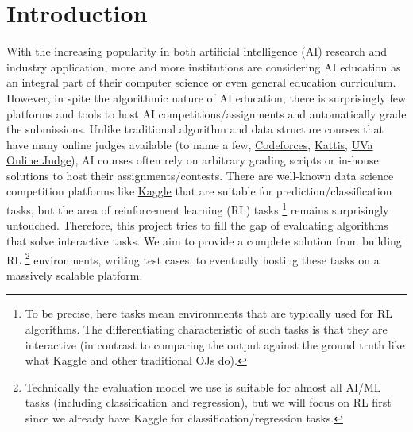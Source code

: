 \chapter{Introduction}

With the increasing popularity in both artificial intelligence (AI) research and industry application, more and more institutions are considering AI education as an integral part of their computer science or even general education curriculum. However, in spite the algorithmic nature of AI education, there is surprisingly few platforms and tools to host AI competitions/assignments and automatically grade the submissions. Unlike traditional algorithm and data structure courses that have many online judges available (to name a few, \href{https://codeforces.com/}{Codeforces}, \href{https://open.kattis.com/}{Kattis}, \href{https://onlinejudge.org/}{UVa Online Judge}), AI courses often rely on arbitrary grading scripts or in-house solutions to host their assignments/contests. There are well-known data science competition platforms like \href{https://www.kaggle.com/}{Kaggle} that are suitable for prediction/classification tasks, but the area of reinforcement learning (RL) tasks \footnote{To be precise, here tasks mean environments that are typically used for RL algorithms. The differentiating characteristic of such tasks is that they are interactive (in contrast to comparing the output against the ground truth like what Kaggle and other traditional OJs do).} remains surprisingly untouched. Therefore, this project tries to fill the gap of evaluating algorithms that solve interactive tasks. We aim to provide a complete solution from building RL \footnote{Technically the evaluation model we use is suitable for almost all AI/ML tasks (including classification and regression), but we will focus on RL first since we already have Kaggle for classification/regression tasks.} environments, writing test cases, to eventually hosting these tasks on a massively scalable platform.
